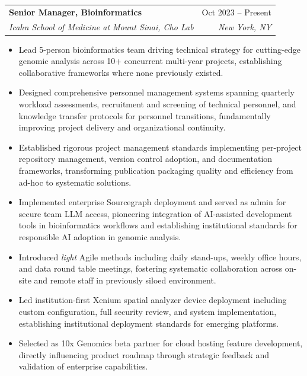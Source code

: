 \documentclass[letterpaper,10pt]{article}
\makeatletter
\newcommand{\resumeItem}[1]{
  \item\small{
    {#1 \vspace{-2pt}}
  }
}
\newcommand{\resumeSubheading}[4]{
  \vspace{-2pt}\item
    \begin{tabular*}{0.97\textwidth}[t]{l@{\extracolsep{\fill}}r}
      \textbf{#1} & #2 \\
      \textit{\small#3} & \textit{\small #4} \\
    \end{tabular*}\vspace{-7pt}
}
\newcommand{\resumeItemListStart}{\begin{itemize}}
\newcommand{\resumeItemListEnd}{\end{itemize}\vspace{-5pt}}
\makeatother
\begin{document}
    \resumeSubheading
      {Senior Manager, Bioinformatics}{Oct 2023 -- Present}
      {Icahn School of Medicine at Mount Sinai, Cho Lab}{New York, NY}
      \resumeItemListStart
        \resumeItem{Lead 5-person bioinformatics team driving technical strategy for cutting-edge genomic analysis across 10+ concurrent multi-year projects, establishing collaborative frameworks where none previously existed.}
        \resumeItem{Designed comprehensive personnel management systems spanning quarterly workload assessments, recruitment and screening of technical personnel, and knowledge transfer protocols for personnel transitions, fundamentally improving project delivery and organizational continuity.}
        \resumeItem{Established rigorous project management standards implementing per-project repository management, version control adoption, and documentation frameworks, transforming publication packaging quality and efficiency from ad-hoc to systematic solutions.}
        \resumeItem{Implemented enterprise Sourcegraph deployment and served as admin for secure team LLM access, pioneering integration of AI-assisted development tools in bioinformatics workflows and establishing institutional standards for responsible AI adoption in genomic analysis.}
        \resumeItem{Introduced \textit{light} Agile methods including daily stand-ups, weekly office hours, and data round table meetings, fostering systematic collaboration across on-site and remote staff in previously siloed environment.}
        \resumeItem{Led institution-first Xenium spatial analyzer device deployment including custom configuration, full security review, and system implementation, establishing institutional deployment standards for emerging platforms.}
        \resumeItem{Selected as 10x Genomics beta partner for cloud hosting feature development, directly influencing product roadmap through strategic feedback and validation of enterprise capabilities.}
      \resumeItemListEnd
\end{document}
